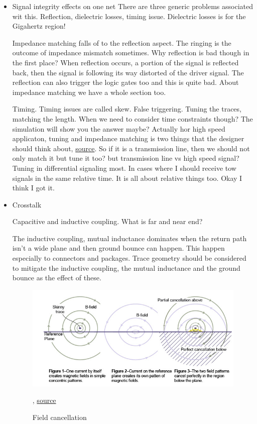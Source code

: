 \documentclass[12pt]{article}
\begin{document}
\begin{itemize}
	\item Signal integrity effects on one net
	There are three generic problems associated wit this. Reflection, dielectric losses, timing issue. Dielectric losses is for the Gigahertz region!
	
	Impedance matching falls of to the reflection aspect. The ringing is the outcome of impedance mismatch sometimes. Why reflection is bad though in the first place? When reflection occurs, a portion of the signal is reflected back, then the signal is following its way distorted of the driver signal. The reflection can also trigger the logic gates too and this is quite bad. About impedance matching we have a whole section too.
	
	
	Timing. Timing issues are called skew. False triggering. Tuning the traces, matching the length. When we need to consider time constraints though? The simulation will show you the answer maybe? Actually hor high speed applicaton, tuning and impedance matching is two things that the designer should think about, \href{https://www.altium.com/documentation/altium-designer/length-tuning-ad}{source}. So if it is a transmission line, then we should not only match it but tune it too? but transmission line vs high speed signal? Tuning in differential signaling most. In cases where I should receive tow signals in the same relative time. It is all about relative things too. Okay I think I got it.
	
	\item Crosstalk
	
	Capacitive and inductive coupling. What is far and near end?
	
	The inductive coupling, mutual inductance dominates when the return path isn't a wide plane and then ground bounce can happen. This happen especially to connectors and packages. Trace geometry should be considered to mitigate the inductive coupling, the mutual inductance and the ground bounce as the effect of these.
	
	\begin{figure}[h!]
		\centering
		\includegraphics[keepaspectratio, width = \textwidth]{assets/field_cancellation.png}	
		\caption{Field cancellation}, \href{http://www.signalintegrity.com/Pubs/edn/FieldCancellation.htm}{source}
	\end{figure}
		

\end{itemize}
\end{document}
